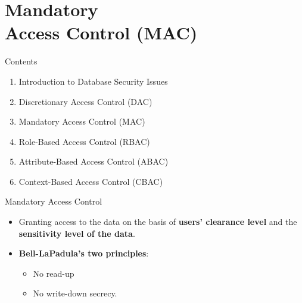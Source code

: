 \section[Mandatory Access Control (MAC)]{Mandatory \\ Access Control (MAC)}
\begin{frame}{Contents}
    \Large
    \begin{enumerate}
        \color{gray} %
        \item Introduction to Database Security Issues
        \item Discretionary Access Control (DAC)
        
        \color{black} \bfseries %
        \item Mandatory Access Control (MAC)
        
        \color{gray} \mdseries %
        \item Role-Based Access Control (RBAC)
        \item Attribute-Based Access Control (ABAC)
        \item Context-Based Access Control (CBAC)
    \end{enumerate}
\end{frame}

\begin{frame}{Mandatory Access Control}
    \Large
    \begin{itemize}
        \vspace{-1.5cm}
        \item Granting access to the data on the basis of \textbf{users' clearance level} and the \textbf{sensitivity level of the data}.
        
        \vspace{0.5cm}
        \item \textbf{Bell-LaPadula's two principles}:
        \begin{itemize}
            \large
            \item No read-up
            \item No write-down secrecy.
        \end{itemize}
    \end{itemize}
\end{frame}

